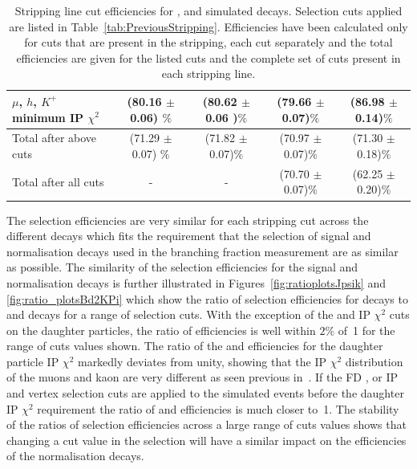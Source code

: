 {\begin{landscape}
\begin{table}[htbp]
\begin{center}
\begin{tabular}{p{6cm}cccc}
$\mu$, $h$, $K^{+}$ minimum IP $\chi^{2}$    & (80.16 $\pm$ 0.06) $\%$  & (80.62 $\pm$ 0.06 )$\%$        & (79.66 $\pm$ 0.07)$\%$        & (86.98 $\pm$ 0.14)$\%$ \\
\hline
Total after above cuts                  & (71.29 $\pm$  0.07) $\%$  & (71.82 $\pm$ 0.07)$\%$        & (70.97 $\pm$ 0.07)$\%$        & (71.30 $\pm$ 0.18)$\%$ \\
\hline
Total after all cuts      & -                         & -                             & (70.70 $\pm$ 0.07)$\%$        & (62.25 $\pm$ 0.20)$\%$ \\
\hline
\end{tabular}
\vspace{0.7cm}
\caption{Stripping line cut efficiencies for \bsmumu, \bhh and  simulated decays. Selection cuts applied are listed in Table~\ref{tab:PreviousStripping}. Efficiencies have been calculated only for cuts that are present in the \bsmumu stripping, each cut separately and the total efficiencies are given for the listed cuts and the complete set of cuts present in each stripping line. }
\label{tab:Run1strippingEff}
\end{center}
\end{table}
\vspace*{\fill}
\end{landscape}
}


The selection efficiencies are very similar for each stripping cut across the different decays which fits the requirement that the selection of signal and normalisation decays used in the branching fraction measurement are as similar as possible. The similarity of the selection efficiencies for the signal and normalisation decays is further illustrated in Figures~\ref{fig:ratioplotsJpsik} and \ref{fig:ratio_plotsBd2KPi} which show the ratio of selection efficiencies for \bsmumu decays to \bujspik and \bdkpi decays for a range of selection cuts. With the exception of the \bsmumu and \bujpsik IP $\chi^{2}$ cuts on the daughter particles, the ratio of efficiencies is well within $2\%$ of~1 for the range of cuts values shown. The ratio of the \bsmumu and \bujpsik efficiencies for the daughter particle IP $\chi^{2}$ markedly deviates from unity, showing that the IP $\chi^{2}$ distribution of the muons and kaon are very different as seen previous in~\cite{Diego}. If the FD \chisqd, \bs or \jpsi IP \chisqd and vertex \chisqd selection cuts are applied to the simulated events before the daughter IP $\chi^{2}$ requirement the ratio of \bmumu and \bujpsik efficiencies is much closer to~1. The stability of the ratios of selection efficiencies across a large range of cuts values shows that changing a cut value in the \bmumu selection will have a similar impact on the efficiencies of the normalisation decays. 


